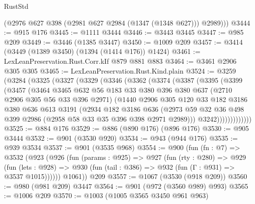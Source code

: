 \begin{lexlean}{RustStd}
\begin{coremodule}
        (@2976 @627 @398 (@2981 @627 @2984 (@1347 (@1348 @627))) @2989)))
@3444 := @915 @176
@3445 := @1111 @3444
@3446 := @3443 @3445
@3447 := @985 @209
@3449 := @3446 (@1385 @3447)
@3450 := @1009 @209
@3457 := @3414 (@3449 (@1389 @3450) (@1394 (@1414 @176)) @1424)
@3461 := LexLeanPreservation.Rust.Corr.kIf @879 @881 @883
@3464 := @3461 @2906 @305 @305
@3465 := LexLeanPreservation.Rust.Kind.plain
@3524 := @3259
    (@3284
      (@3325
        (@3327
          (@3329
            (@3346
              (@3362
                (@3374
                  (@3387
                    (@3395
                      (@3399
                        (@3457
                          (@3464
                            @3465
                            @632
                            @56
                            @183
                            @33
                            @380
                            @396
                            @380
                            @637
                            (@2710 @2906 @305 @56 @33 @396 @2971)
                            (@1440
                              @2906
                              @305
                              @120
                              @33
                              @182
                              @3186
                              @380
                              @636
                              @613
                              @3191
                              (@2934
                                @182
                                @3186
                                @636
                                (@2973
                                  @59
                                  @32
                                  @36
                                  @498
                                  @399
                                  @2986
                                  (@2958 @58 @33 @35 @396 @398 @2971 @2989)))
                              @3242)))))))))))))
@3525 := @884 @176
@3529 := @886 (@890 @176) (@896 @176)
@3530 := @905 @3444
@3532 := @901 (@3530 @920)
@3534 := @943 (@944 @176)
@3535 := @939 @3534
@3537 := @901 (@3535 @968)
@3554 := @900
    (fun (fn : @7) =>
    @3532
      (@923
        (@926
          (fun (params : @925) =>
          @927
            (fun (rty : @280) =>
            @929
              (fun (lets : @928) =>
              @930 (fun (tail : @386) => @932 (fun (Γ : @931) => @3537 @1015))))))
        @1061))
    @209
@3557 := @1067 (@3530 (@918 @209))
@3560 := @980 (@981 @209) @3447
@3564 := @901 (@972 (@3560 @989) @993)
@3565 := @1006 @209
@3570 := @1003 (@1005 @3565 @3450 @961 @963)

\end{coremodule}
\end{lexlean}
